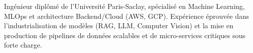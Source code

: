 

\begin{cvparagraph}

Ingénieur diplômé de l'Université Paris-Saclay, spécialisé en Machine Learning, MLOps et architecture Backend/Cloud (AWS, GCP). Expérience éprouvée dans l'industrialisation de modèles (RAG, LLM, Computer Vision) et la mise en production de pipelines de données scalables et de micro-services critiques sous forte charge.
\end{cvparagraph}
